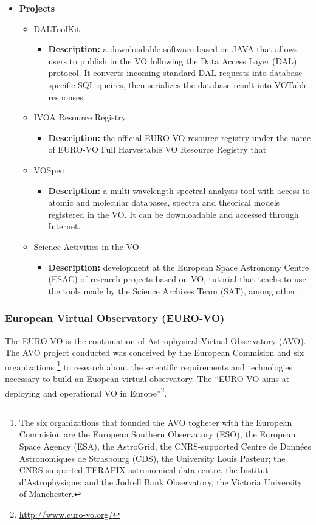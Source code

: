 \begin{itemize}
\item \textbf{Projects}
\begin{itemize}
\item DALToolKit
\begin{itemize}
\item \textbf{Description:} a downloadable software based on JAVA that allows
users to publish in the VO following the Data Access Layer (DAL) protocol. It
converts incoming standard DAL requests into database specific SQL queires, then
serializes the database result into VOTable responses. 
\end{itemize}
\item IVOA Resource Registry
\begin{itemize}
\item \textbf{Description:} the official EURO-VO resource registry under the
name of EURO-VO Full Harvestable VO Resource Registry that 
\end{itemize}
\item VOSpec
\begin{itemize}
\item \textbf{Description:} a multi-wavelength spectral analysis tool with
access to atomic and molecular databases, spectra and theorical models
registered in the VO. It can be downloadable and accessed through Internet.
\end{itemize}
\item Science Activities in the VO
\begin{itemize}
\item \textbf{Description:} development at the European Space Astronomy Centre
(ESAC) of research projects based on VO, tutorial that teachs to use the tools
made by the Science Archives Team (SAT), among other.
\end{itemize}
\end{itemize}
\end{itemize}

\subsubsection{European Virtual Observatory (EURO-VO)}
The EURO-VO \cite{website:euro-vo-home} is the continuation of Astrophysical
Virtual Observatory (AVO). The AVO project conducted was conceived by the
European Commision and six organizations \footnote{The six organizations that
founded the AVO togheter with the European Commision are the European Southern
Observatory (ESO), the European Space Agency (ESA), the AstroGrid, the
CNRS-supported Centre de Données Astronomiques de Strasbourg (CDS), the
University Louis Pasteur; the CNRS-supported TERAPIX astronomical data centre,
the Institut d'Astrophysique; and the Jodrell Bank Observatory, the Victoria
University of Manchester.} to research about the scientific requirements and
technologies necessary to build an Euopean virtual observatory. The ``EURO-VO
aims at deploying and operational VO in
Europe''\footnote{\url{http://www.euro-vo.org/}}.\\


